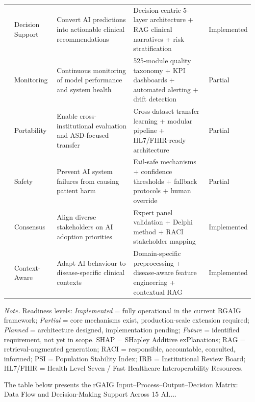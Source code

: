 \begin{table}[!htbp]
\begin{tabularx}{\textwidth}{@{} p{0.4cm} p{2.5cm} L L p{2.2cm} @{}}
 & Decision Support & Convert AI predictions into actionable clinical recommendations & Decision-centric 5-layer architecture + RAG clinical narratives + risk stratification & Implemented \\
 & Monitoring & Continuous monitoring of model performance and system health & 525-module quality taxonomy + KPI dashboards + automated alerting + drift detection & Partial \\
 & Portability & Enable cross-institutional evaluation and ASD-focused transfer & Cross-dataset transfer learning + modular pipeline + HL7/FHIR-ready architecture & Partial \\
 & Safety & Prevent AI system failures from causing patient harm & Fail-safe mechanisms + confidence thresholds + fallback protocols + human override & Partial \\
 & Consensus & Align diverse stakeholders on AI adoption priorities & Expert panel validation + Delphi method + RACI stakeholder mapping & Implemented \\
 & Context-Aware & Adapt AI behaviour to disease-specific clinical contexts & Domain-specific preprocessing + disease-aware feature engineering + contextual RAG & Implemented \\
\bottomrule
\end{tabularx}
\vspace{0.5em}\noindent\textit{Note.} Readiness levels: \textit{Implemented} = fully operational in the current RGAIG framework; \textit{Partial} = core mechanisms exist, production-scale extension required; \textit{Planned} = architecture designed, implementation pending; \textit{Future} = identified requirement, not yet in scope. SHAP = SHapley Additive exPlanations; RAG = retrieval-augmented generation; RACI = responsible, accountable, consulted, informed; PSI = Population Stability Index; IRB = Institutional Review Board; HL7/FHIR = Health Level Seven / Fast Healthcare Interoperability Resources.
\end{table}
\fi

\iffalse
\noindent The table below presents the rGAIG Input--Process--Output--Decision Matrix: Data Flow and Decision-Making Support Across 15 AI....

